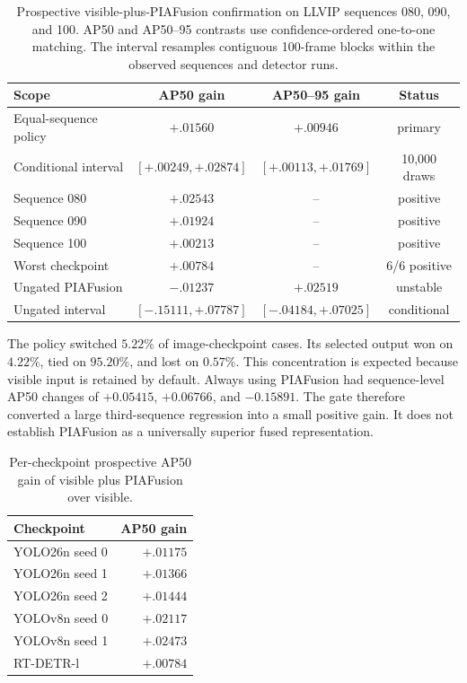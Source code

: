 \documentclass[11pt]{article}
\begin{document}
\begin{table}[ht]
\centering
\small
\setlength{\tabcolsep}{3pt}
\caption{Prospective visible-plus-PIAFusion confirmation on LLVIP sequences
080, 090, and 100. AP50 and AP50--95 contrasts use confidence-ordered
one-to-one matching. The interval resamples contiguous 100-frame blocks within
the observed sequences and detector runs.}
\label{tab:pia-prospective}
\begin{tabular}{@{}lccc@{}}
\toprule
Scope & AP50 gain & AP50--95 gain & Status \\
\midrule
Equal-sequence policy & \(+.01560\) & \(+.00946\) & primary \\
Conditional interval & \([+.00249,+.02874]\) & \([+.00113,+.01769]\) & 10,000 draws \\
Sequence 080 & \(+.02543\) & -- & positive \\
Sequence 090 & \(+.01924\) & -- & positive \\
Sequence 100 & \(+.00213\) & -- & positive \\
Worst checkpoint & \(+.00784\) & -- & 6/6 positive \\
Ungated PIAFusion & \(-.01237\) & \(+.02519\) & unstable \\
Ungated interval & \([-.15111,+.07787]\) & \([-.04184,+.07025]\) & conditional \\
\bottomrule
\end{tabular}
\end{table}

The policy switched \(5.22\%\) of image-checkpoint cases. Its selected output
won on \(4.22\%\), tied on \(95.20\%\), and lost on \(0.57\%\). This
concentration is expected because visible input is retained by default.
Always using PIAFusion had sequence-level AP50 changes of \(+0.05415\),
\(+0.06766\), and \(-0.15891\). The gate therefore converted a large
third-sequence regression into a small positive gain. It does not establish
PIAFusion as a universally superior fused representation.

\begin{table}[ht]
\centering
\small
\caption{Per-checkpoint prospective AP50 gain of visible plus PIAFusion over
visible.}
\label{tab:pia-prospective-checkpoints}
\begin{tabular}{@{}lr@{}}
\toprule
Checkpoint & AP50 gain \\
\midrule
YOLO26n seed 0 & \(+.01175\) \\
YOLO26n seed 1 & \(+.01366\) \\
YOLO26n seed 2 & \(+.01444\) \\
YOLOv8n seed 0 & \(+.02117\) \\
YOLOv8n seed 1 & \(+.02473\) \\
RT-DETR-l & \(+.00784\) \\
\bottomrule
\end{tabular}
\end{table}
\end{document}
